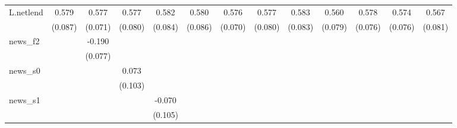 {\begin{tabular}{l*{12}{c}}
\addlinespace
L.netlend   &       0.579\sym{***}&       0.577\sym{***}&       0.577\sym{***}&       0.582\sym{***}&       0.580\sym{***}&       0.576\sym{***}&       0.577\sym{***}&       0.583\sym{***}&       0.560\sym{***}&       0.578\sym{***}&       0.574\sym{***}&       0.567\sym{***}\\
            &     (0.087)         &     (0.071)         &     (0.080)         &     (0.084)         &     (0.086)         &     (0.070)         &     (0.080)         &     (0.083)         &     (0.079)         &     (0.076)         &     (0.076)         &     (0.081)         \\
\addlinespace
news\_f2     &                     &      -0.190\sym{**} &                     &                     &                     &                     &                     &                     &                     &                     &                     &                     \\
            &                     &     (0.077)         &                     &                     &                     &                     &                     &                     &                     &                     &                     &                     \\
\addlinespace
news\_s0     &                     &                     &       0.073         &                     &                     &                     &                     &                     &                     &                     &                     &                     \\
            &                     &                     &     (0.103)         &                     &                     &                     &                     &                     &                     &                     &                     &                     \\
\addlinespace
news\_s1     &                     &                     &                     &      -0.070         &                     &                     &                     &                     &                     &                     &                     &                     \\
            &                     &                     &                     &     (0.105)         &                     &                     &                     &                     &                     &                     &                     &                     \\

\end{tabular}}
